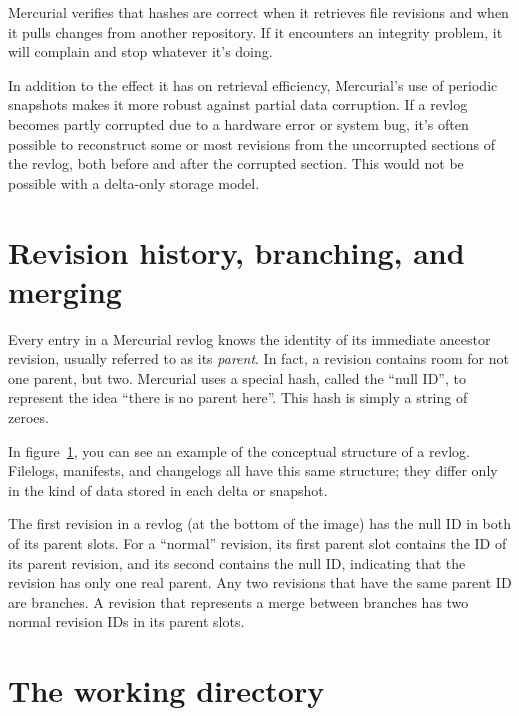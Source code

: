 Mercurial verifies that hashes are correct when it retrieves file
revisions and when it pulls changes from another repository.  If it
encounters an integrity problem, it will complain and stop whatever
it's doing.

In addition to the effect it has on retrieval efficiency, Mercurial's
use of periodic snapshots makes it more robust against partial data
corruption.  If a revlog becomes partly corrupted due to a hardware
error or system bug, it's often possible to reconstruct some or most
revisions from the uncorrupted sections of the revlog, both before and
after the corrupted section.  This would not be possible with a
delta-only storage model.

\section{Revision history, branching,
  and merging}

Every entry in a Mercurial revlog knows the identity of its immediate
ancestor revision, usually referred to as its \emph{parent}.  In fact,
a revision contains room for not one parent, but two.  Mercurial uses
a special hash, called the ``null ID'', to represent the idea ``there
is no parent here''.  This hash is simply a string of zeroes.

In figure~\ref{fig:concepts:revlog}, you can see an example of the
conceptual structure of a revlog.  Filelogs, manifests, and changelogs
all have this same structure; they differ only in the kind of data
stored in each delta or snapshot.

The first revision in a revlog (at the bottom of the image) has the
null ID in both of its parent slots.  For a ``normal'' revision, its
first parent slot contains the ID of its parent revision, and its
second contains the null ID, indicating that the revision has only one
real parent.  Any two revisions that have the same parent ID are
branches.  A revision that represents a merge between branches has two
normal revision IDs in its parent slots.

\begin{figure}[ht]
  \centering
  \caption{}
  \label{fig:concepts:revlog}
\end{figure}

\section{The working directory}

